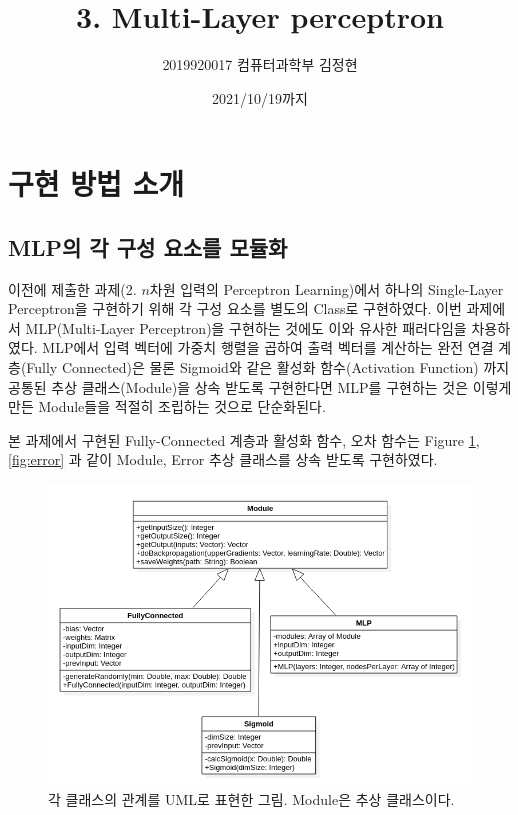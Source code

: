 \documentclass[letterpaper,10pt]{article}
\begin{document}
	
	\title{3. Multi-Layer perceptron}
	\author{2019920017 컴퓨터과학부 김정현}
	\date{2021/10/19까지}
	\maketitle
	
	\section{구현 방법 소개}
	
	\subsection{MLP의 각 구성 요소를 모듈화}
	
	이전에 제출한 과제(2. $n$차원 입력의 Perceptron Learning)에서 하나의 Single-Layer Perceptron을 구현하기 위해 각 구성 요소를 별도의 Class로 구현하였다. 이번 과제에서 MLP(Multi-Layer Perceptron)을 구현하는 것에도 이와 유사한 패러다임을 차용하였다. MLP에서 입력 벡터에 가중치 행렬을 곱하여 출력 벡터를 계산하는 완전 연결 계층(Fully Connected)은 물론 Sigmoid와 같은 활성화 함수(Activation Function) 까지 공통된 추상 클래스(Module)을 상속 받도록 구현한다면 MLP를 구현하는 것은 이렇게 만든 Module들을 적절히 조립하는 것으로 단순화된다.
	
	본 과제에서 구현된 Fully-Connected 계층과 활성화 함수, 오차 함수는 Figure \ref{fig:module}, \ref{fig:error} 과 같이 Module, Error 추상 클래스를 상속 받도록 구현하였다.
	
	\begin{figure}
		\centering
		\includegraphics[width=\linewidth]{images/uml-module.png}
		\caption{각 클래스의 관계를 UML로 표현한 그림. Module은 추상 클래스이다.}
		\label{fig:module}
	\end{figure}
	
\end{document}
